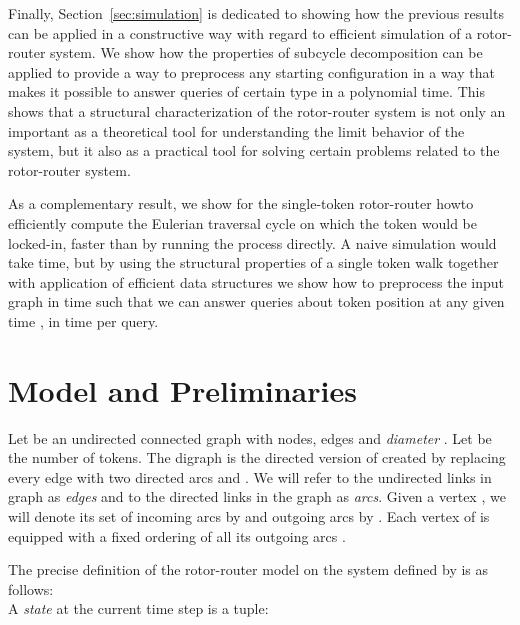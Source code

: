 \documentclass{article}[11pt,letter]
\begin{document}
Finally, Section~\ref{sec:simulation} is dedicated to showing how the previous results can be applied in a constructive way with regard to efficient simulation of a rotor-router system.  We show how the properties of subcycle decomposition can be applied to provide a way to preprocess any starting configuration in a way that makes it possible to answer queries of certain type in a polynomial time. This shows that a structural characterization of the rotor-router system is not only an important as a theoretical tool for understanding the limit behavior of the system, but it also as a practical tool for solving certain problems related to the rotor-router system.

As a complementary result, we show for the single-token rotor-router howto efficiently compute the Eulerian traversal cycle on which the token would be locked-in, faster than by running the process directly. A naive simulation would take  time, but by using the structural properties of a single token walk together with application of efficient data structures we show how to preprocess the input graph in time  such that we can answer queries about token position at any given time , in  time per query.



\vspace{-0.2cm}

\section{Model and Preliminaries}

Let  be an undirected connected graph with  nodes,  edges and \emph{diameter} . Let  be the number of tokens. The digraph  is the directed version of  created by replacing every edge  with two directed arcs  and . We will refer to the undirected links in graph  as \emph{edges} and to the directed links in the graph  as \emph{arcs}. Given a vertex , we will denote its set of incoming arcs by  and outgoing arcs by .
Each vertex  of  is equipped with a fixed ordering of all its outgoing arcs .

The precise definition of the rotor-router model on the system defined by  is as follows:\\ A \emph{state} at the current time step   is a tuple:
\end{document}
